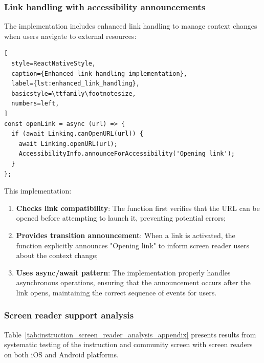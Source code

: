 \subsubsection{Link handling with accessibility announcements}
\label{subsubsec:instruction-link-handling}

The implementation includes enhanced link handling to manage context changes when users navigate to external resources:

\begin{lstlisting}[
  style=ReactNativeStyle,
  caption={Enhanced link handling implementation},
  label={lst:enhanced_link_handling},
  basicstyle=\ttfamily\footnotesize,
  numbers=left,
]
const openLink = async (url) => {
  if (await Linking.canOpenURL(url)) {
    await Linking.openURL(url);
    AccessibilityInfo.announceForAccessibility('Opening link');
  }
};
\end{lstlisting}
\FloatBarrier

This implementation:

\begin{enumerate}
    \item \textbf{Checks link compatibility}: The function first verifies that the URL can be opened before attempting to launch it, preventing potential errors;
    
    \item \textbf{Provides transition announcement}: When a link is activated, the function explicitly announces "Opening link" to inform screen reader users about the context change;
    
    \item \textbf{Uses async/await pattern}: The implementation properly handles asynchronous operations, ensuring that the announcement occurs after the link opens, maintaining the correct sequence of events for users.
\end{enumerate}

\subsubsection{Screen reader support analysis}
\label{subsubsec:instruction-screen-reader-analysis}

Table~\ref{tab:instruction_screen_reader_analysis_appendix} presents results from systematic testing of the instruction and community screen with screen readers on both iOS and Android platforms.

